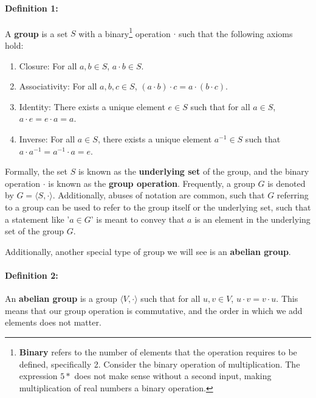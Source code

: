 \documentclass[twoside]{article}
\begin{document}
\begin{spacing}{1.25}
\paragraph*{Definition 1:} A \textbf{group} is a set $S$ with a binary\footnote[1]{\textbf{Binary} refers to the number of elements that the operation requires to be defined, specifically 2. Consider the binary operation of multiplication. The expression $5*$ does not make sense without a second input, making multiplication of real numbers a binary operation. }
operation $\cdot$ 
such that the following axioms hold:
\begin{enumerate}
    \item Closure: For all $a,b \in S$, $a \cdot b \in S$.
    \item Associativity: For all $a,b,c \in S$, $(a \cdot b) \cdot c = a \cdot (b \cdot c)$.
    \item Identity: There exists a unique element $e \in S$ such that for all $a \in S$, $a \cdot e = e \cdot a = a$.
    \item Inverse: For all $a \in S$, there exists a unique element $a^{-1} \in S$ such that $a \cdot a^{-1} = a^{-1} \cdot a = e$.
\end{enumerate}
Formally, the set $S$ is known as the \textbf{underlying set} of the group, and 
the binary operation $\cdot$ is known as the \textbf{group operation}. Frequently,
a group $G$ is denoted by $G = \langle S, \cdot \rangle$. Additionally, abuses 
of notation are common, such that $G$ referring to a group can be used to refer 
to the group itself or the underlying set, such that a statement like '$a\in G$'
is meant to convey that $a$ is an element in the underlying set of the group $G$.

Additionally, another special type of group we will see is an \textbf{abelian group}.

\paragraph{\textbf{Definition 2:}} An \textbf{abelian group} is a group $\langle V, \cdot \rangle$
such that for all $u,v \in V$, $u\cdot v = v\cdot u$. This means that our group operation 
is commutative, and the order in which we add elements does not matter.


\end{spacing}
\end{document}
